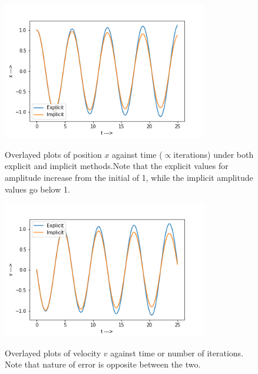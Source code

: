 \documentclass{report}
\begin{document}
\begin{figure}[H]
	\centering
	\includegraphics[width = 0.8\textwidth]{cx.png}
	\label{cx}
	\caption{Overlayed plots of position $x$ against time ($\propto$iterations) under both explicit and implicit methods.Note that the explicit values for amplitude increase from the initial of 1, while the implicit amplitude values go below 1.}
\end{figure}
\begin{figure}[H]
	\centering
	\includegraphics[width = 0.8\textwidth]{cv.png}
	\label{cv}
	\caption{Overlayed plots of velocity $v$ against time or number of iterations.  Note that nature of error is opposite between the two.}
\end{figure}
\end{document}
